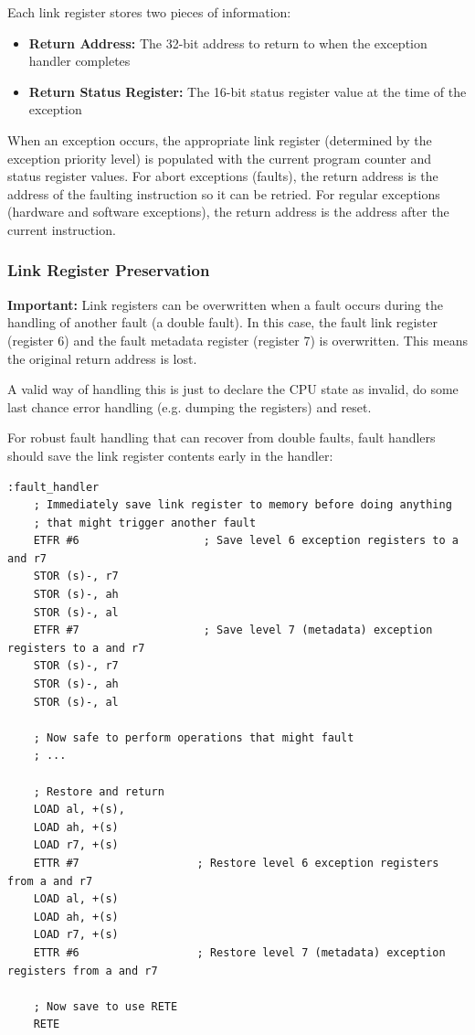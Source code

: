 Each link register stores two pieces of information:

\begin{itemize}
	\item \textbf{Return Address:} The 32-bit address to return to when the exception handler completes
	\item \textbf{Return Status Register:} The 16-bit status register value at the time of the exception
\end{itemize}

When an exception occurs, the appropriate link register (determined by the exception priority level) is populated with
the current program counter and status register values. For abort exceptions (faults), the return address is the
address of the faulting instruction so it can be retried. For regular exceptions (hardware and software exceptions),
the return address is the address after the current instruction.

\subsubsection{Link Register Preservation}

\textbf{Important:} Link registers can be overwritten when a fault occurs during the handling of another fault (a double fault).
In this case, the fault link register (register 6) and the fault metadata register (register 7) is overwritten.
This means the original return address is lost.

A valid way of handling this is just to declare the CPU state as invalid, do some last chance error handling (e.g.
dumping the registers) and reset.

For robust fault handling that can recover from double faults, fault handlers should save the link register contents
early in the handler:

\begin{lstlisting}
:fault_handler
    ; Immediately save link register to memory before doing anything
    ; that might trigger another fault
    ETFR #6                   ; Save level 6 exception registers to a and r7
    STOR (s)-, r7
    STOR (s)-, ah
    STOR (s)-, al
    ETFR #7                   ; Save level 7 (metadata) exception registers to a and r7
    STOR (s)-, r7
    STOR (s)-, ah
    STOR (s)-, al

    ; Now safe to perform operations that might fault
    ; ...

    ; Restore and return
    LOAD al, +(s),
    LOAD ah, +(s)
    LOAD r7, +(s)
    ETTR #7                  ; Restore level 6 exception registers from a and r7
    LOAD al, +(s)
    LOAD ah, +(s)
    LOAD r7, +(s)
    ETTR #6                  ; Restore level 7 (metadata) exception registers from a and r7

	; Now save to use RETE
	RETE

\end{lstlisting}

